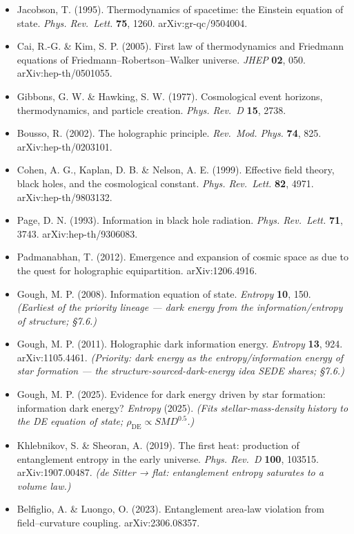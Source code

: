 \documentclass[
  10pt,
]{article}
\providecommand{\tightlist}{%
  \setlength{\itemsep}{0pt}\setlength{\parskip}{0pt}}
\begin{document}
\begin{itemize}
\tightlist
\item
  Jacobson, T. (1995). Thermodynamics of spacetime: the Einstein
  equation of state. \emph{Phys. Rev.~Lett.} \textbf{75}, 1260.
  arXiv:gr-qc/9504004.
\item
  Cai, R.-G. \& Kim, S. P. (2005). First law of thermodynamics and
  Friedmann equations of Friedmann--Robertson--Walker universe.
  \emph{JHEP} \textbf{02}, 050. arXiv:hep-th/0501055.
\item
  Gibbons, G. W. \& Hawking, S. W. (1977). Cosmological event horizons,
  thermodynamics, and particle creation. \emph{Phys. Rev.~D}
  \textbf{15}, 2738.
\item
  Bousso, R. (2002). The holographic principle. \emph{Rev.~Mod. Phys.}
  \textbf{74}, 825. arXiv:hep-th/0203101.
\item
  Cohen, A. G., Kaplan, D. B. \& Nelson, A. E. (1999). Effective field
  theory, black holes, and the cosmological constant. \emph{Phys.
  Rev.~Lett.} \textbf{82}, 4971. arXiv:hep-th/9803132.
\item
  Page, D. N. (1993). Information in black hole radiation. \emph{Phys.
  Rev.~Lett.} \textbf{71}, 3743. arXiv:hep-th/9306083.
\item
  Padmanabhan, T. (2012). Emergence and expansion of cosmic space as due
  to the quest for holographic equipartition. arXiv:1206.4916.
\item
  Gough, M. P. (2008). Information equation of state. \emph{Entropy}
  \textbf{10}, 150. \emph{(Earliest of the priority lineage --- dark
  energy from the information/entropy of structure; §7.6.)}
\item
  Gough, M. P. (2011). Holographic dark information energy.
  \emph{Entropy} \textbf{13}, 924. arXiv:1105.4461. \emph{(Priority:
  dark energy as the entropy/information energy of star formation ---
  the structure-sourced-dark-energy idea SEDE shares; §7.6.)}
\item
  Gough, M. P. (2025). Evidence for dark energy driven by star
  formation: information dark energy? \emph{Entropy} (2025). \emph{(Fits
  stellar-mass-density history to the DE equation of state;
  \(\rho _{\mathrm{DE}} \propto  SMD^{0.5}\).)}
\item
  Khlebnikov, S. \& Sheoran, A. (2019). The first heat: production of
  entanglement entropy in the early universe. \emph{Phys. Rev.~D}
  \textbf{100}, 103515. arXiv:1907.00487. \emph{(de Sitter → flat:
  entanglement entropy saturates to a volume law.)}
\item
  Belfiglio, A. \& Luongo, O. (2023). Entanglement area-law violation
  from field--curvature coupling. arXiv:2306.08357.
\end{itemize}
\end{document}
